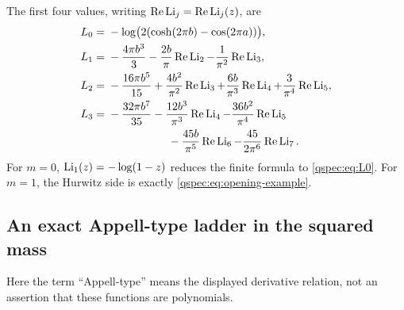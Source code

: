 The first four values, writing $\operatorname{Re}\operatorname{Li}_j=\operatorname{Re}\operatorname{Li}_j(z)$, are
\begin{align}
L_0={}&-\log\bigl(2(\cosh(2\pi b)-\cos(2\pi a))\bigr),\label{qspec:eq:L0}\\
L_1={}&-\frac{4\pi b^3}{3}-\frac{2b}{\pi}\Rea\Li_2
                       -\frac1{\pi^2}\Rea\Li_3,\label{qspec:eq:L1}\\
L_2={}&-\frac{16\pi b^5}{15}+\frac{4b^2}{\pi^2}\Rea\Li_3
              +\frac{6b}{\pi^3}\Rea\Li_4+\frac3{\pi^4}\Rea\Li_5,\label{qspec:eq:L2}\\
L_3={}&-\frac{32\pi b^7}{35}-\frac{12b^3}{\pi^3}\Rea\Li_4
              -\frac{36b^2}{\pi^4}\Rea\Li_5\notag\\
     &\hspace{19mm}-\frac{45b}{\pi^5}\Rea\Li_6
              -\frac{45}{2\pi^6}\Rea\Li_7.
\label{qspec:eq:L3}
\end{align}
For $m=0$, $\operatorname{Li}_1(z)=-\log(1-z)$ reduces the finite formula to
\eqref{qspec:eq:L0}. For $m=1$, the Hurwitz side is exactly
\eqref{qspec:eq:opening-example}.

\subsection{An exact Appell-type ladder in the squared mass}
Here the term ``Appell-type'' means the displayed derivative relation,
not an assertion that these functions are polynomials.

